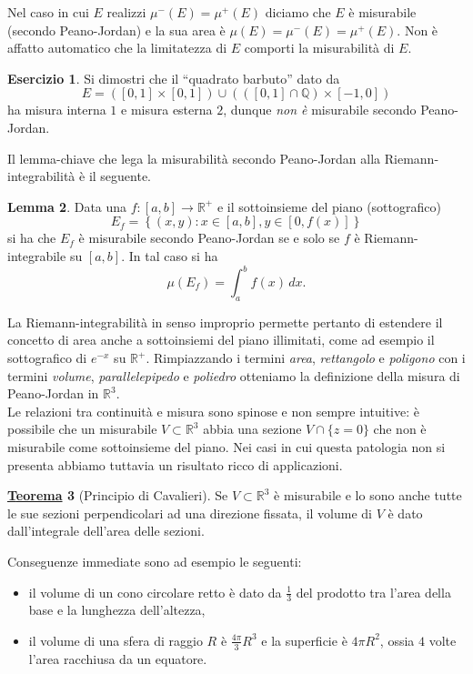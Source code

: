 \documentclass[a4paper,twoside]{article}
\newcommand{\Q}{\mathbb{Q}}
\newcommand{\R}{\mathbb{R}}
\theoremstyle{definition}
\newtheorem{theorem}{\color{Red}\underline{\textrm Teorema}}
\newenvironment{theo}
  {\begin{shaded}\begin{theorem}}
  {\end{theorem}\end{shaded}}
\newtheorem{lemma}[theorem]{Lemma}
\newtheorem{ex}[theorem]{Esercizio}
\numberwithin{theorem}{section}
\begin{document}
Nel caso in cui $E$ realizzi $\mu^-(E)=\mu^+(E)$ diciamo che $E$ è misurabile (secondo Peano-Jordan) e la sua area è $\mu(E)=\mu^-(E)=\mu^+(E)$. Non è affatto automatico che la limitatezza di $E$ comporti la misurabilità di $E$.
\begin{ex} Si dimostri che il ``quadrato barbuto'' dato da
$$ E=([0,1]\times[0,1])\cup (([0,1]\cap\Q)\times [-1,0]) $$
ha misura interna $1$ e misura esterna $2$, dunque \emph{non è} misurabile secondo Peano-Jordan. 
\end{ex}
Il lemma-chiave che lega la misurabilità secondo Peano-Jordan alla Riemann-integrabilità è il seguente.
\begin{lemma} Data una $f:[a,b]\to\R^+$ e il sottoinsieme del piano (sottografico) 
$$ E_f = \left\{(x,y): x\in[a,b], y\in[0,f(x)]\right\} $$
si ha che $E_f$ è misurabile secondo Peano-Jordan se e solo se $f$ è Riemann-integrabile su $[a,b]$. In tal caso si ha 
$$ \mu(E_f)=\int_{a}^{b} f(x)\,dx.$$
\end{lemma}

La Riemann-integrabilità in senso improprio permette pertanto di estendere il concetto di area anche a sottoinsiemi del piano illimitati, come ad esempio il sottografico di $e^{-x}$ su $\R^+$. Rimpiazzando i termini \emph{area}, \emph{rettangolo} e \emph{poligono} con i termini \emph{volume}, \emph{parallelepipedo} e \emph{poliedro} otteniamo la definizione della misura di Peano-Jordan in $\R^3$.\\
Le relazioni tra continuità e misura sono spinose e non sempre intuitive: è possibile che un misurabile $V\subset\R^3$ abbia una sezione $V\cap\{z=0\}$ che non è misurabile come sottoinsieme del piano. Nei casi in cui questa patologia non si presenta abbiamo tuttavia un risultato ricco di applicazioni.

\begin{theo}[Principio di Cavalieri] Se $V\subset\R^3$ è misurabile e lo sono anche tutte le sue sezioni perpendicolari ad una direzione fissata, il volume di $V$ è dato dall'integrale dell'area delle sezioni. 
\end{theo}

Conseguenze immediate sono ad esempio le seguenti:
\begin{itemize}
 \item il volume di un cono circolare retto è dato da $\frac{1}{3}$ del prodotto tra l'area della base e la lunghezza dell'altezza,
 \item il volume di una sfera di raggio $R$ è $\frac{4\pi}{3}R^3$ e la superficie è $4\pi R^2$, ossia $4$ volte l'area racchiusa da un equatore.
\end{itemize}
\end{document}
